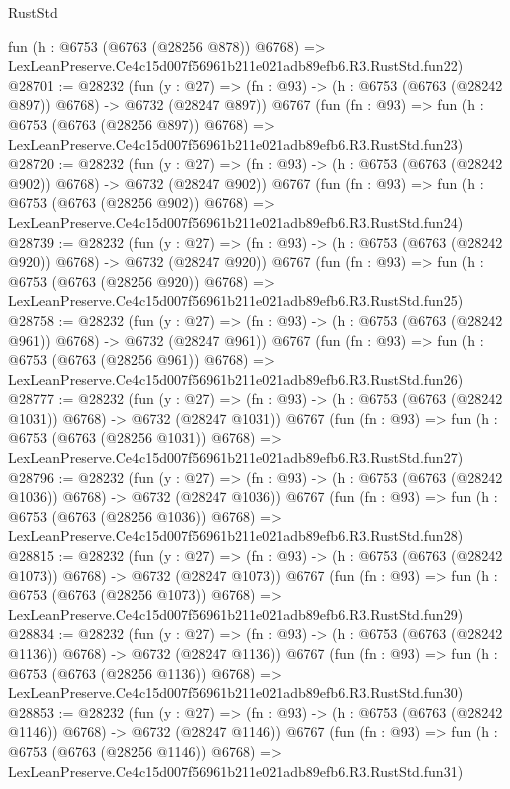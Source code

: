 \begin{lexlean}{RustStd}
\begin{coremodule}
    fun (h : @6753 (@6763 (@28256 @878)) @6768) =>
    LexLeanPreserve.Ce4c15d007f56961b211e021adb89efb6.R3.RustStd.fun22)
@28701 := @28232
    (fun (y : @27) => (fn : @93) -> (h : @6753 (@6763 (@28242 @897)) @6768) -> @6732 (@28247 @897))
    @6767
    (fun (fn : @93) =>
    fun (h : @6753 (@6763 (@28256 @897)) @6768) =>
    LexLeanPreserve.Ce4c15d007f56961b211e021adb89efb6.R3.RustStd.fun23)
@28720 := @28232
    (fun (y : @27) => (fn : @93) -> (h : @6753 (@6763 (@28242 @902)) @6768) -> @6732 (@28247 @902))
    @6767
    (fun (fn : @93) =>
    fun (h : @6753 (@6763 (@28256 @902)) @6768) =>
    LexLeanPreserve.Ce4c15d007f56961b211e021adb89efb6.R3.RustStd.fun24)
@28739 := @28232
    (fun (y : @27) => (fn : @93) -> (h : @6753 (@6763 (@28242 @920)) @6768) -> @6732 (@28247 @920))
    @6767
    (fun (fn : @93) =>
    fun (h : @6753 (@6763 (@28256 @920)) @6768) =>
    LexLeanPreserve.Ce4c15d007f56961b211e021adb89efb6.R3.RustStd.fun25)
@28758 := @28232
    (fun (y : @27) => (fn : @93) -> (h : @6753 (@6763 (@28242 @961)) @6768) -> @6732 (@28247 @961))
    @6767
    (fun (fn : @93) =>
    fun (h : @6753 (@6763 (@28256 @961)) @6768) =>
    LexLeanPreserve.Ce4c15d007f56961b211e021adb89efb6.R3.RustStd.fun26)
@28777 := @28232
    (fun (y : @27) =>
    (fn : @93) -> (h : @6753 (@6763 (@28242 @1031)) @6768) -> @6732 (@28247 @1031))
    @6767
    (fun (fn : @93) =>
    fun (h : @6753 (@6763 (@28256 @1031)) @6768) =>
    LexLeanPreserve.Ce4c15d007f56961b211e021adb89efb6.R3.RustStd.fun27)
@28796 := @28232
    (fun (y : @27) =>
    (fn : @93) -> (h : @6753 (@6763 (@28242 @1036)) @6768) -> @6732 (@28247 @1036))
    @6767
    (fun (fn : @93) =>
    fun (h : @6753 (@6763 (@28256 @1036)) @6768) =>
    LexLeanPreserve.Ce4c15d007f56961b211e021adb89efb6.R3.RustStd.fun28)
@28815 := @28232
    (fun (y : @27) =>
    (fn : @93) -> (h : @6753 (@6763 (@28242 @1073)) @6768) -> @6732 (@28247 @1073))
    @6767
    (fun (fn : @93) =>
    fun (h : @6753 (@6763 (@28256 @1073)) @6768) =>
    LexLeanPreserve.Ce4c15d007f56961b211e021adb89efb6.R3.RustStd.fun29)
@28834 := @28232
    (fun (y : @27) =>
    (fn : @93) -> (h : @6753 (@6763 (@28242 @1136)) @6768) -> @6732 (@28247 @1136))
    @6767
    (fun (fn : @93) =>
    fun (h : @6753 (@6763 (@28256 @1136)) @6768) =>
    LexLeanPreserve.Ce4c15d007f56961b211e021adb89efb6.R3.RustStd.fun30)
@28853 := @28232
    (fun (y : @27) =>
    (fn : @93) -> (h : @6753 (@6763 (@28242 @1146)) @6768) -> @6732 (@28247 @1146))
    @6767
    (fun (fn : @93) =>
    fun (h : @6753 (@6763 (@28256 @1146)) @6768) =>
    LexLeanPreserve.Ce4c15d007f56961b211e021adb89efb6.R3.RustStd.fun31)

\end{coremodule}
\end{lexlean}
